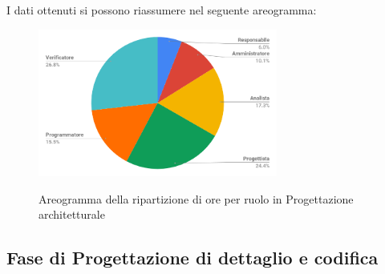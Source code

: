 \pagebreak
I dati ottenuti si possono riassumere nel seguente areogramma:
\begin{figure}[H] 
			\centering 
				\includegraphics[width=0.7\textwidth]{res/images/areogramma_architetturale.png}\\
				\caption{Areogramma della ripartizione di ore per ruolo in Progettazione architetturale}
			\label{AreogrammaArchitetturale}
\end{figure}

\subsection{Fase di Progettazione di dettaglio e codifica}

